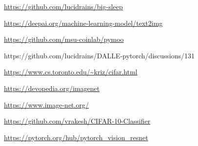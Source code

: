 \documentclass[11pt,a4paper,openany]{book}
\begin{document}
\begin{thebibliography}{a,b,c}
 \url{https://github.com/lucidrains/big-sleep}

 \url{https://deepai.org/machine-learning-model/text2img}

 \url{https://github.com/msu-coinlab/pymoo}

 https://github.com/lucidrains/DALLE-pytorch/discussions/131

 \url{https://www.cs.toronto.edu/~kriz/cifar.html}

 \url{https://devopedia.org/imagenet}

 \url{https://www.image-net.org/}

 \url{https://github.com/vrakesh/CIFAR-10-Classifier}

 \url{https://pytorch.org/hub/pytorch_vision_resnet}

\end{thebibliography}
\end{document}
